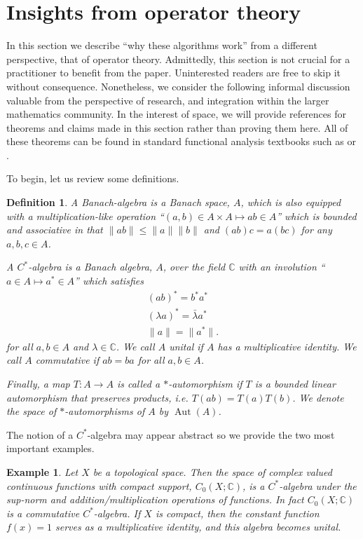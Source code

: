 \documentclass[final,leqno]{siamltex1213}
\newtheorem{defn}[thm]{Definition}
\newtheorem{example}[thm]{Example}
\begin{document}
\section{Insights from operator theory}

In this section we describe ``why these algorithms work'' from a different perspective, that of operator theory.
Admittedly, this section is not crucial for a practitioner to benefit from the paper.
Uninterested readers are free to skip it without consequence.
Nonetheless, we consider the following informal discussion valuable from the perspective of research, and integration within the larger mathematics community.
In the interest of space, we will provide references for theorems and claims made in this section rather than proving them here.
All of these theorems can be found in standard functional analysis textbooks such as \cite{Conway1990} or \cite{Rudin1991}.

To begin, let us review some definitions.
\begin{defn}
	A \emph{Banach-algebra} is a Banach space, $A$, which is also equipped with a multiplication-like operation ``$(a,b) \in A \times A \mapsto ab \in A$''
	which is bounded and associative in that $\| ab \| \leq \|a \| \|b \|$ and $(ab)c = a(bc)$ for any $a,b,c \in A$.
	
	A \emph{$C^{*}$-algebra} is a Banach algebra, $A$, over the field $\mathbb{C}$ with an involution ``$a \in A \mapsto a^{*} \in A$'' which satisfies
	\begin{align}
		(ab)^{*} = b^{*} a^{*} \\
		(\lambda a)^{*} = \bar{\lambda} a^{*} \\
		\| a \| = \| a^{*}\|.
	\end{align}
	for all $a,b \in A$ and $\lambda \in \mathbb{C}$.
	We call $A$ \emph{unital} if $A$ has a multiplicative identity.
	We call $A$ commutative if $ab = ba$ for all $a,b \in A$.
	
	Finally, a map $T:A \to A$ is called a $*$-automorphism if $T$ is a bounded linear automorphism that preserves products, i.e. $T(ab) = T(a) T(b)$.
	We denote the space of $*$-automorphisms of $A$ by $\operatorname{Aut}(A)$.
\end{defn}

The notion of a $C^{*}$-algebra may appear abstract so we provide the two most important examples.

\begin{example} \label{ex:function algebra}
	Let $X$ be a topological space.  Then the space of complex valued continuous functions with compact support, $C_{0}(X;\mathbb{C})$, is a $C^{*}$-algebra under the sup-norm and addition/multiplication operations of functions.
	In fact $C_{0}(X;\mathbb{C})$ is a commutative $C^{*}$-algebra.  If $X$ is compact, then the constant function $f(x) = 1$ serves as a multiplicative identity, and this algebra becomes unital.
\end{example}
\end{document}
